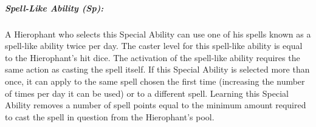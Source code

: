 \subparagraph{Spell-Like Ability (Sp):}
A Hierophant who selects this Special Ability can use one of his spells known as a spell-like ability twice per day.
The caster level for this spell-like ability is equal to the Hierophant's hit dice.
The activation of the spell-like ability requires the same action as casting the spell itself.
If this Special Ability is selected more than once, it can apply to the same spell chosen the first time (increasing the number of times per day it can be used) or to a different spell.
Learning this Special Ability removes a number of spell points equal to the minimum amount required to cast the spell in question from the Hierophant's pool.